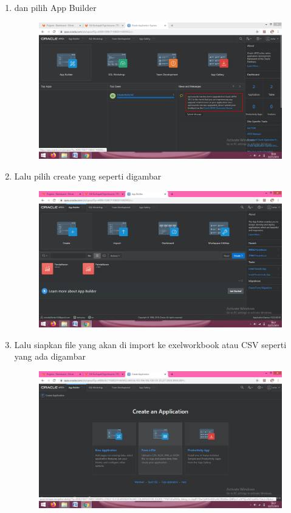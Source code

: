 \begin{enumerate}
	\item dan pilih App Builder
	\begin{figure} [!htbp]
	\includegraphics[scale=0.2]{section/gambar/c.png}
	\centering
	\end{figure}
	
	\item Lalu pilih create yang seperti digambar 
	\begin{figure} [!htbp]
	\includegraphics[scale=0.2]{section/gambar/d.png}
	\centering
	\end{figure}
	
	\item Lalu siapkan file yang akan di import ke exelworkbook atau CSV seperti yang ada digambar 
	\begin{figure} [!htbp]
	\includegraphics[scale=0.2]{section/gambar/e.png}
	\centering
	\end{figure}


\end{enumerate}
